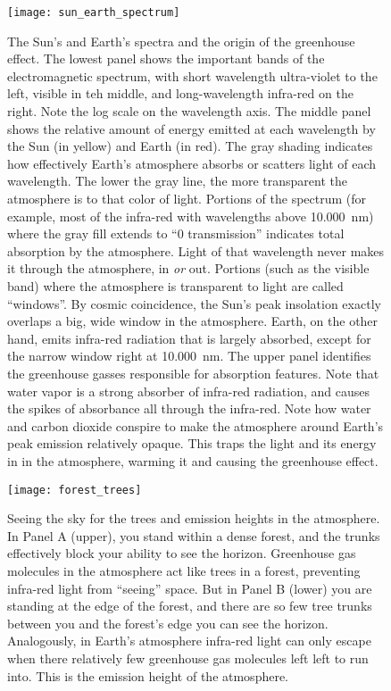 \documentclass[amstex,12pt]{book}
\begin{document}
\begin{figure}[p]
\centering
\texttt{[image: sun\_earth\_spectrum]}%
\caption{The Sun’s and Earth's spectra and the origin of the greenhouse effect. The lowest panel shows the important bands of the electromagnetic spectrum, with short wavelength ultra-violet to the left, visible in teh middle, and long-wavelength infra-red on the right. Note the log scale on the wavelength axis. The middle panel shows the relative amount of energy emitted at each wavelength by the Sun (in yellow) and Earth (in red). The gray shading indicates how effectively Earth's atmosphere absorbs or scatters light of each wavelength. The lower the gray line, the more transparent the atmosphere is to that color of light. Portions of the spectrum (for example, most of the infra-red with wavelengths above \SI{10,000}{\nano\metre}) where the gray fill extends to ``0 transmission'' indicates total absorption by the atmosphere. Light of that wavelength never makes it through the atmosphere, in \textit{or} out. Portions (such as the visible band) where the atmosphere is transparent to light are called ``windows''. By cosmic coincidence, the Sun’s peak insolation exactly overlaps a big, wide window in the atmosphere. Earth, on the other hand, emits infra-red radiation that is largely absorbed, except for the narrow window right at \SI{10,000}{\nano\metre}. The upper panel identifies the greenhouse gasses responsible for absorption features. Note that water vapor is a strong absorber of infra-red radiation, and causes the spikes of absorbance all through the infra-red. Note how water and carbon dioxide conspire to make the atmosphere around Earth's peak emission relatively opaque. This traps the light and its energy in in the atmosphere, warming it and causing the greenhouse effect.}   
\label{fig:sun_earth_spectrum}
\end{figure}

\begin{figure}[p]
\centering
\texttt{[image: forest\_trees]}%
\caption{Seeing the sky for the trees and emission heights in the atmosphere. In Panel A (upper), you stand within a dense forest, and the trunks effectively block your ability to see the horizon. Greenhouse gas molecules in the atmosphere act like trees in a forest, preventing infra-red light from ``seeing'' space. But in Panel B (lower) you are standing at the edge of the forest, and there are so few tree trunks between you and the forest's edge you can see the horizon. Analogously, in Earth's atmosphere infra-red light can only escape when there relatively few greenhouse gas molecules left left to run into. This is the emission height of the atmosphere.}   
\label{fig:forest_trees}
\end{figure}
\end{document}
